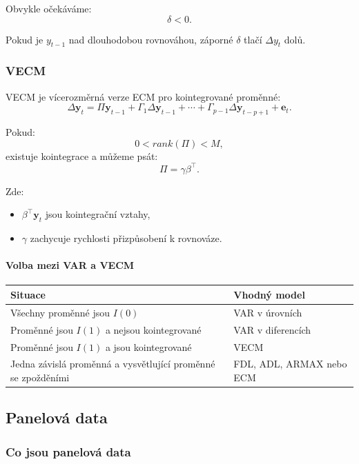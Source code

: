 Obvykle očekáváme:
\[
    \delta<0.
\]

Pokud je $y_{t-1}$ nad dlouhodobou rovnováhou, záporné $\delta$ tlačí $\Delta y_t$ dolů.

\subsubsection{VECM}

VECM je vícerozměrná verze ECM pro kointegrované proměnné:
\[
    \Delta\mathbf y_t
    =
    \Pi\mathbf y_{t-1}
    +
    \Gamma_1\Delta\mathbf y_{t-1}
    +\cdots+
    \Gamma_{p-1}\Delta\mathbf y_{t-p+1}
    +
    \mathbf e_t.
\]

Pokud:
\[
    0<rank(\Pi)<M,
\]
existuje kointegrace a můžeme psát:
\[
    \Pi=\gamma\beta^\top.
\]

Zde:
\begin{itemize}
    \item $\beta^\top \mathbf y_t$ jsou kointegrační vztahy,
    \item $\gamma$ zachycuje rychlosti přizpůsobení k rovnováze.
\end{itemize}

\paragraph{Volba mezi VAR a VECM}

\begin{center}
\begin{tabular}{|p{}|p{}|}
\hline
\textbf{Situace} & \textbf{Vhodný model} \\
\hline
Všechny proměnné jsou $I(0)$ & VAR v úrovních \\
\hline
Proměnné jsou $I(1)$ a nejsou kointegrované & VAR v diferencích \\
\hline
Proměnné jsou $I(1)$ a jsou kointegrované & VECM \\
\hline
Jedna závislá proměnná a vysvětlující proměnné se zpožděními & FDL, ADL, ARMAX nebo ECM \\
\hline
\end{tabular}
\end{center}

\subsection{Panelová data}

\subsubsection{Co jsou panelová data}

